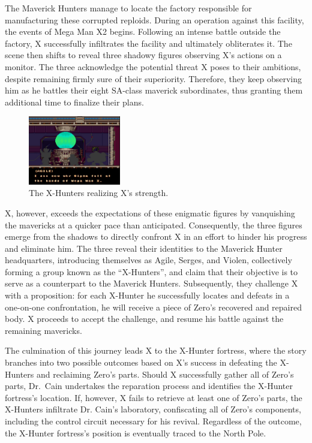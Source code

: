  The Maverick Hunters manage to locate the factory responsible for manufacturing these corrupted reploids. During an operation against this facility, the events of Mega Man X2 begins. Following an intense battle outside the factory, X successfully infiltrates the facility  and ultimately obliterates it. The scene then shifts to reveal three shadowy figures observing X's actions on a monitor. The three acknowledge the potential threat X poses to their ambitions, despite remaining firmly sure of their superiority. Therefore, they keep observing him as he battles their eight SA-class maverick subordinates, thus granting them additional time to finalize their plans. 
\begin{figure}[htp]
	\centering
	\includegraphics[height=3cm]{figures/X2/story_2.jpg}
	\caption {The X-Hunters realizing X's strength.}
\end{figure}
X, however, exceeds the expectations of these enigmatic figures by vanquishing the mavericks at a quicker pace than anticipated. Consequently, the three figures emerge from the shadows to directly confront X in an effort to hinder his progress and eliminate him. The three reveal their identities to the Maverick Hunter headquarters, introducing themselves as Agile, Serges, and Violen, collectively forming a group known as the ``X-Hunters'', and claim that their objective is to serve as a counterpart to the Maverick Hunters. Subsequently, they challenge X with a proposition: for each X-Hunter he successfully locates and defeats in a one-on-one confrontation, he will receive a piece of Zero's recovered and repaired body. X proceeds to accept the challenge, and resume his battle against the remaining mavericks.

The culmination of this journey leads X to the X-Hunter fortress, where the story branches into two possible outcomes based on X's success in defeating the X-Hunters and reclaiming Zero's parts. Should X successfully gather all of Zero's parts, Dr.~Cain undertakes the reparation process and identifies the X-Hunter fortress's location. If, however, X fails to retrieve at least one of Zero's parts, the X-Hunters infiltrate Dr. Cain's laboratory, confiscating all of Zero's components, including the control circuit necessary for his revival. Regardless of the outcome, the X-Hunter fortress's position is eventually traced to the North Pole.

